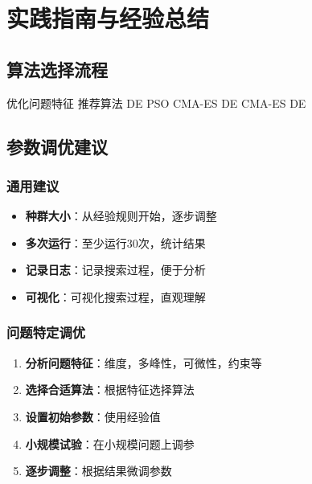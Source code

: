 \section{实践指南与经验总结}

\subsection{算法选择流程}

\begin{algorithm}[H]
\caption{进化算法选择流程}
\begin{algorithmic}[1]
\REQUIRE 优化问题特征
\ENSURE 推荐算法
    \RETURN DE 
    \RETURN PSO 
    \RETURN CMA-ES 
    \RETURN DE 
    \RETURN CMA-ES 
\ELSE
    \RETURN DE 
\ENDIF
\end{algorithmic}
\end{algorithm}

\subsection{参数调优建议}

\subsubsection{通用建议}

\begin{itemize}
    \item \textbf{种群大小}：从经验规则开始，逐步调整
    \item \textbf{多次运行}：至少运行30次，统计结果
    \item \textbf{记录日志}：记录搜索过程，便于分析
    \item \textbf{可视化}：可视化搜索过程，直观理解
\end{itemize}

\subsubsection{问题特定调优}

\begin{enumerate}
    \item \textbf{分析问题特征}：维度，多峰性，可微性，约束等
    \item \textbf{选择合适算法}：根据特征选择算法
    \item \textbf{设置初始参数}：使用经验值
    \item \textbf{小规模试验}：在小规模问题上调参
    \item \textbf{逐步调整}：根据结果微调参数
\end{enumerate}

